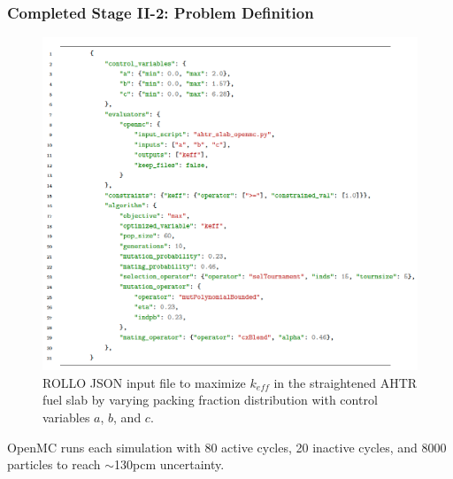 \begin{frame}
    \frametitle{Completed Stage II-2: Problem Definition}
    \begin{figure}
        \vspace{-0.2cm}
        \begin{minipage}[c]{0.7\textwidth}
        \includegraphics[width=0.9\linewidth]{figures/ii2-rollo-input.png}
        \end{minipage}\hfill
        \begin{minipage}[c]{0.3\textwidth}
        \caption{ROLLO JSON input file to maximize $k_{eff}$ in the 
        straightened AHTR fuel slab by varying packing fraction distribution 
        with control variables $a$, $b$, and $c$.}
        \end{minipage}
    \end{figure}
    \scriptsize
    OpenMC runs each simulation with 80 active cycles, 20 inactive cycles, and 
    8000 particles to reach $\sim$130pcm uncertainty.
\end{frame}

